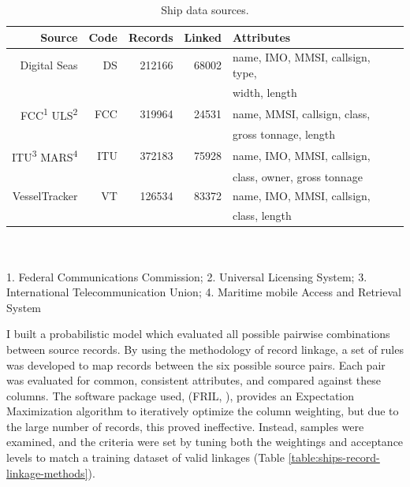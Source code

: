 \begin{table}
  \caption[Ship data sources]{Ship data sources.}
  \tabcolsep=0.11cm
  \renewcommand{\arraystretch}{0.7}
  \begin{tabular}{rrrrl}
    \hline
    Source & Code & Records & Linked & Attributes \\
    \hline
     Digital Seas & DS & 212166 & 68002 & name, IMO, MMSI, callsign, type, \\
                  &    &        &       &  width, length \\
      FCC\textsuperscript{1} ULS\textsuperscript{2} & FCC & 319964 & 24531 & name, MMSI, callsign, class,\\ 
                                                    &     &        &       & gross tonnage, length \\
      ITU\textsuperscript{3} MARS\textsuperscript{4} & ITU & 372183 & 75928 & name, IMO, MMSI, callsign, \\ 
                                                     &     &        &       & class, owner, gross tonnage \\ 
     VesselTracker & VT & 126534 & 83372 & name, IMO, MMSI, callsign,\\
                   &    &        &       & class, length
  \end{tabular}
  \\
  \\
  \footnotesize{1. Federal Communications Commission; 2. Universal Licensing System;  3. International Telecommunication Union; 4. Maritime mobile Access and Retrieval System}
  \label{table:ships-data-sources}
\end{table}

I built a probabilistic model which evaluated all possible pairwise combinations between source records. By using the methodology of record linkage, a set of rules was developed to map records between the six possible source pairs. Each pair was evaluated for common, consistent attributes, and compared against these columns. The software package used, (FRIL, \citealp{Jurczyk2008fril}), provides an Expectation Maximization algorithm to iteratively optimize the column weighting, but due to the large number of records, this proved ineffective. Instead, samples were examined, and the criteria were set by tuning both the weightings and acceptance levels to match a training dataset of valid linkages (Table \ref{table:ships-record-linkage-methods}). 

